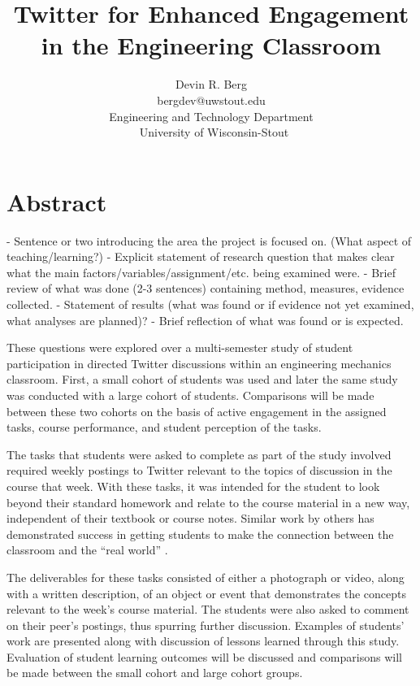 \documentclass[12pt]{article}
\title{\large \textbf{Twitter for Enhanced Engagement in the Engineering Classroom}} %
\author{\vspace{-5ex}}
\author{\normalsize Devin R. Berg\\
\normalsize bergdev@uwstout.edu\\
\normalsize Engineering and Technology Department\\\
\normalsize University of Wisconsin-Stout}
\date{\vspace{-5ex}} %
\begin{document}
\raggedright
\maketitle
\thispagestyle{empty}
\pagestyle{empty}

\section*{Abstract}
- Sentence or two introducing the area the project is focused on. (What aspect of teaching/learning?)
- Explicit statement of research question that makes clear what the main factors/variables/assignment/etc. being examined were.
- Brief review of what was done (2-3 sentences) containing method, measures, evidence collected.
- Statement of results (what was found or if evidence not yet examined, what analyses are planned)?
- Brief reflection of what was found or is expected.

These questions were explored over a multi-semester study of student participation in directed Twitter discussions within an engineering mechanics classroom. First, a small cohort of students was used and later the same study was conducted with a large cohort of students. Comparisons will be made between these two cohorts on the basis of active engagement in the assigned tasks, course performance, and student perception of the tasks.

The tasks that students were asked to complete as part of the study involved required weekly postings to Twitter relevant to the topics of discussion in the course that week. With these tasks, it was intended for the student to look beyond their standard homework and relate to the course material in a new way, independent of their textbook or course notes. Similar work by others has demonstrated success in getting students to make the connection between the classroom and the “real world” \cite{hopp_journal_2008}.

The deliverables for these tasks consisted of either a photograph or video, along with a written description, of an object or event that demonstrates the concepts relevant to the week’s course material. The students were also asked to comment on their peer's postings, thus spurring further discussion. Examples of students’ work are presented along with discussion of lessons learned through this study. Evaluation of student learning outcomes will be discussed and comparisons will be made between the small cohort and large cohort groups.
\end{document}
